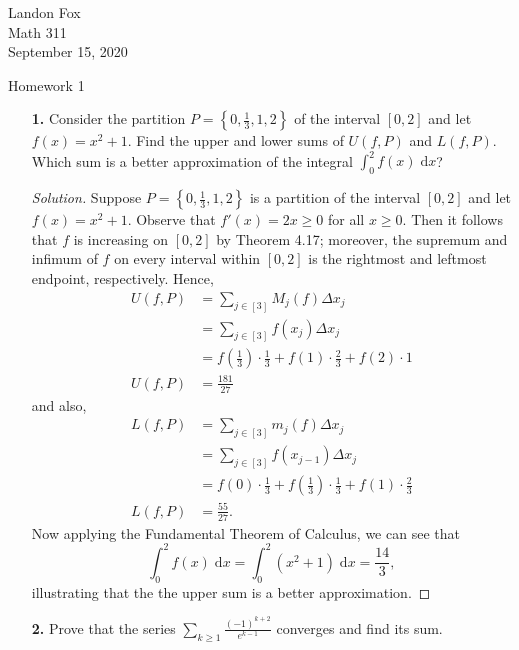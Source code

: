 \documentclass[ 12pt ]{article}
\begin{document}
\noindent Landon Fox \\
\noindent Math 311 \\
\noindent September 15, 2020

\begin{center}
\Large Homework 1
\end{center}

\begin{enumerate}
	\item[\textbf{1.}] Consider the partition $P = \left \{ 0, \frac{1}{3}, 1, 2 \right \}$ of the interval $[0, 2]$ and let $f(x) = x^2 + 1$. Find the upper and lower sums of $U(f, P)$
		and $L(f, P)$. Which sum is a better approximation of the integral $\int_0^2 f(x)\; \mathrm{d}x$?

		\begin{proof}[Solution]
			Suppose $P = \left \{ 0, \frac{1}{3}, 1, 2 \right \}$ is a partition of the interval $[0, 2]$ and let $f(x) = x^2 + 1$. Observe that $f'(x) = 2x \geq 0$ for all $x \geq 0$.
			Then it follows that $f$ is increasing on $[0, 2]$ by Theorem 4.17; moreover, the supremum and infimum of $f$ on every interval within $[0, 2]$ is the rightmost and leftmost
			endpoint, respectively. Hence,
			\begin{align*}
				U(f, P) &= \sum_{j \in [3]} M_j(f) \Delta x_j \\
				&= \sum_{j \in [3]} f(x_j) \Delta x_j \\
				&= f \left ( \frac{1}{3} \right ) \cdot \frac{1}{3} + f(1) \cdot \frac{2}{3} + f(2) \cdot 1 \\
				U(f, P) &= \frac{181}{27}
			\end{align*}
			and also,
			\begin{align*}
				L(f, P) &= \sum_{j \in [3]} m_j(f) \Delta x_j \\
				&= \sum_{j \in [3]} f(x_{j-1}) \Delta x_j \\
				&= f(0) \cdot \frac{1}{3} + f \left ( \frac{1}{3} \right ) \cdot \frac{1}{3} + f(1) \cdot \frac{2}{3} \\
				L(f, P) &= \frac{55}{27}.
			\end{align*}
			Now applying the Fundamental Theorem of Calculus, we can see that $$\int_0^2 f(x)\; \mathrm{d}x = \int_0^2 (x^2 + 1)\; \mathrm{d}x = \frac{14}{3},$$ illustrating that
			the the upper sum is a better approximation.
		\end{proof}


	\item[\textbf{2.}] Prove that the series $\sum_{k \geq 1} \frac{(-1)^{k+2}}{e^{k-1}}$ converges and find its sum.


\end{enumerate}
\end{document}
